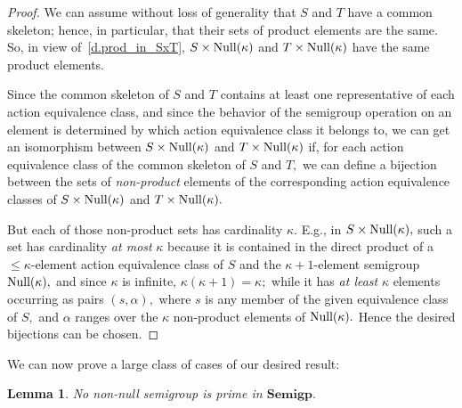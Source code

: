 \documentclass{amsart}
\newtheorem{lemma}[theorem]{Lemma}
\numberwithin{equation}{section}
\numberwithin{theorem}{section}
\begin{document}
\begin{proof}
We can assume without loss of generality that
$S$ and $T$ have a common skeleton; hence, in particular, that
their sets of product elements are the same.
So, in view of~\eqref{d.prod_in_SxT},
$S\times\textup{Null}(\kappa)$ and $T\times\textup{Null}(\kappa)$
have the same product elements.

Since the common skeleton of $S$ and $T$ contains at least one
representative of each action equivalence class, and since the
behavior of the semigroup operation on an element is
determined by which action equivalence class it belongs to,
we can get an isomorphism between
$S\times\textup{Null}(\kappa)$ and $T\times\textup{Null}(\kappa)$
if, for each action equivalence class of the common skeleton
of $S$ and $T,$ we can
define a bijection between the sets of {\em non-product} elements of
the corresponding action equivalence classes of
$S\times\textup{Null}(\kappa)$ and $T\times\textup{Null}(\kappa).$

But each of those non-product sets has cardinality $\kappa.$
E.g., in $S\times\textup{Null}(\kappa),$ such a set
has cardinality {\em at most} $\kappa$ because it is contained in
the direct product of a $\leq\kappa\!$-element action
equivalence class of $S$ and the $\kappa\!+\!1\!$-element
semigroup $\textup{Null}(\kappa),$
and since $\kappa$ is infinite, $\kappa(\kappa\!+\!1)=\kappa;$
while it has {\em at least} $\kappa$
elements occurring as pairs $(s,\alpha),$ where $s$ is any
member of the given equivalence class of $S,$ and
$\alpha$ ranges over the $\kappa$ non-product elements of
$\textup{Null}(\kappa).$
Hence the desired bijections can be chosen.
\end{proof}

We can now prove a large class of cases of our desired result:

\begin{lemma}\label{L.non-null}
No non-null semigroup is prime in $\mathbf{Semigp}.$
\end{lemma}
\end{document}
